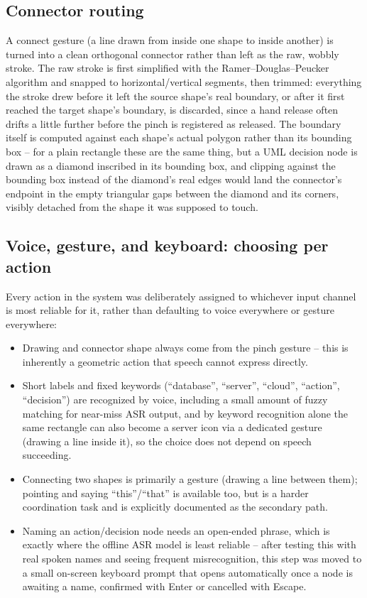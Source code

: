 \documentclass[sigconf]{acmart}
\begin{document}
\subsection{Connector routing}
A connect gesture (a line drawn from inside one shape to inside another)
is turned into a clean orthogonal connector rather than left as the raw,
wobbly stroke. The raw stroke is first simplified with the
Ramer--Douglas--Peucker algorithm and snapped to horizontal/vertical
segments, then trimmed: everything the stroke drew before it left the
source shape's real boundary, or after it first reached the target
shape's boundary, is discarded, since a hand release often drifts a
little further before the pinch is registered as released. The boundary
itself is computed against each shape's actual polygon rather than its
bounding box -- for a plain rectangle these are the same thing, but a UML
decision node is drawn as a diamond inscribed in its bounding box, and
clipping against the bounding box instead of the diamond's real edges
would land the connector's endpoint in the empty triangular gaps between
the diamond and its corners, visibly detached from the shape it was
supposed to touch.

\subsection{Voice, gesture, and keyboard: choosing per action}
Every action in the system was deliberately assigned to whichever input
channel is most reliable for it, rather than defaulting to voice
everywhere or gesture everywhere:
\begin{itemize}
  \item Drawing and connector shape always come from the pinch gesture --
    this is inherently a geometric action that speech cannot express
    directly.
  \item Short labels and fixed keywords (``database'', ``server'',
    ``cloud'', ``action'', ``decision'') are recognized by voice,
    including a small amount of fuzzy matching for near-miss ASR output,
    and by keyword recognition alone the same rectangle can also become a
    server icon via a dedicated gesture (drawing a line inside it), so the
    choice does not depend on speech succeeding.
  \item Connecting two shapes is primarily a gesture (drawing a line
    between them); pointing and saying ``this''/``that'' is available
    too, but is a harder coordination task and is explicitly documented as
    the secondary path.
  \item Naming an action/decision node needs an open-ended phrase, which
    is exactly where the offline ASR model is least reliable -- after
    testing this with real spoken names and seeing frequent
    misrecognition, this step was moved to a small on-screen keyboard
    prompt that opens automatically once a node is awaiting a name,
    confirmed with Enter or cancelled with Escape.
\end{itemize}
\end{document}
